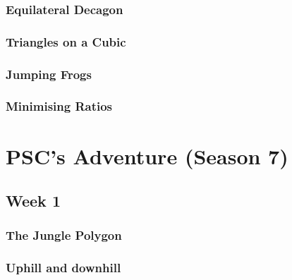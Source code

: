 \documentclass[titlepage=true]{scrartcl}
\begin{document}
        \subsubsection{Equilateral Decagon}
            \label{6-2-4}
            
        \newpage

        \subsubsection{Triangles on a Cubic} 
            \label{6-2-5}
            
        \newpage

        \subsubsection{Jumping Frogs}
            \label{6-2-6}
            
        \newpage 

        \subsubsection{Minimising Ratios}
            \label{6-2-7}
            
        \newpage

\section{PSC's Adventure (Season 7)}

	\subsection{Week 1}
	
        \subsubsection{The Jungle Polygon}
            \label{7-1-1}
            
            \newpage
            
            \subsubsection{Uphill and downhill}
            \label{7-1-2}  
            
        \newpage
\end{document}
